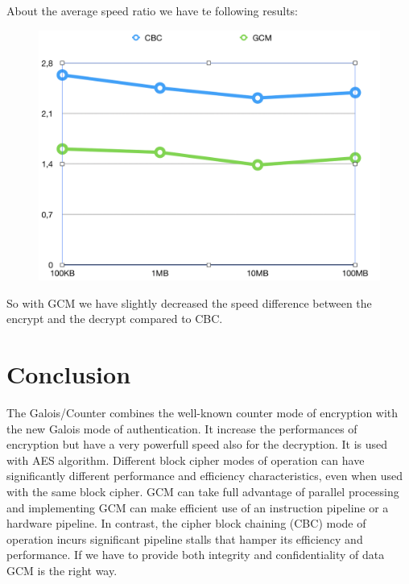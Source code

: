 \documentclass[11pt]{article}
\begin{document}
About the average speed ratio we have te following results:

\begin{figure}[hbt!]
  \centering
  \includegraphics[width=.8\textwidth]{pic7-hw3-1635747}
  \label{fig:speed ratio}
\end{figure}

So with GCM we have slightly decreased the speed difference between the encrypt and the decrypt compared to CBC.

\section{Conclusion}
The Galois/Counter combines the well-known counter mode of encryption with the new Galois mode of authentication. It increase the performances of encryption but have a very powerfull speed also for the decryption. It is used with AES algorithm. Different block cipher modes of operation can have significantly different performance and efficiency characteristics, even when used with the same block cipher. GCM can take full advantage of parallel processing and implementing GCM can make efficient use of an instruction pipeline or a hardware pipeline. In contrast, the cipher block chaining (CBC) mode of operation incurs significant pipeline stalls that hamper its efficiency and performance. If we have to provide both integrity and confidentiality of data GCM is the right way.
\end{document}
